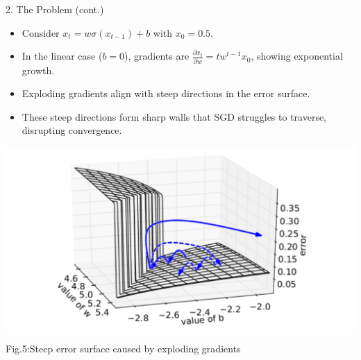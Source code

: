 \documentclass[final]{beamer}
\begin{document}
\begin{frame}[t]
\begin{columns}[t,totalwidth=\textwidth]
\begin{column}{0.3\textwidth}
\begin{block}{2. The Problem (cont.)}
        \begin{minipage}[t]{0.54\textwidth}
        \begin{itemize}
                \item \justifying Consider $x_t = w\sigma(x_{t-1}) + b$ with $x_0 = 0.5$.
                \item \justifying In the linear case ($b = 0$), gradients are $\frac{\partial x_t}{\partial w} = t w^{t-1} x_0$, showing exponential growth.
                \item \justifying Exploding gradients align with steep directions in the error surface.
                \item \justifying These steep directions form sharp walls that SGD struggles to traverse, disrupting convergence.
        \end{itemize}
        
        \end{minipage}%
        \hfill
        \begin{minipage}[t]{0.45\textwidth}
          \centering
          \vspace{-1em} %
          \includegraphics[width=\linewidth]{figures/geometric.png}
          
        \vspace{0.3em} %
        {\small Fig.5:Steep error surface caused by exploding gradients}
    \end{minipage}
    \end{block}
    

\end{column}
\end{columns}
\end{frame}
\end{document}
